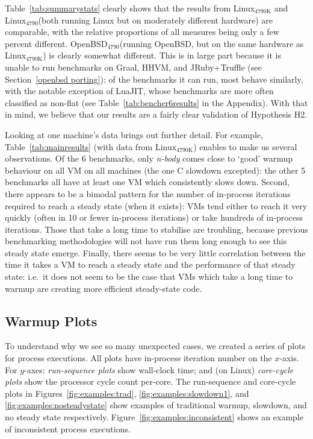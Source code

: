 \documentclass[preprint,numbers,10pt]{sigplanconf}
\newcommand{\nbody}{\emph{n-body}\xspace}
\newcommand{\bencherthree}{Linux$_\mathrm{4790K}$\xspace}
\newcommand{\bencherfive}{Linux$_\mathrm{4790}$\xspace}
\newcommand{\benchersix}{OpenBSD$_\mathrm{4790}$\xspace}
\begin{document}
Table~\ref{tab:summarystats} clearly shows that the results from \bencherthree
and \bencherfive (both running Linux but on moderately different hardware) are
comparable, with the relative proportions of all measures being only a few
percent different. \benchersix (running OpenBSD, but on the same hardware as
\bencherthree) is clearly somewhat different. This is in large part because it
is unable to run benchmarks on Graal, HHVM, and JRuby+Truffle (see
Section~\ref{openbsd porting}): of the benchmarks it can run, most behave
similarly, with the notable exception of LuaJIT, whose benchmarks are more often
classified as non-flat (see Table~\ref{tab:bencher6results} in the Appendix).
With that in mind, we believe that our results are a fairly clear validation of
Hypothesis H2.

Looking at one machine's data brings out further detail. For
example, Table~\ref{tab:mainresults} (with data from \bencherthree)
enables to make us several observations. Of the 6 benchmarks, only \nbody comes
close to `good' warmup behaviour on all
VM on all machines (the one C slowdown excepted): the other 5 benchmarks all have at least one VM which consistently
slows down. Second, there appears to be a bimodal pattern for the number
of in-process iterations required to reach a steady state (when it exists): VMs
tend either to reach it very quickly (often in 10 or fewer in-process iterations)
or take hundreds of in-process iterations. Those that take a long time
to stabilise are troubling, because previous benchmarking methodologies
will not have run them long enough to see this steady state emerge.
Finally, there seems to be very little
correlation between the time it takes a VM to reach a steady state and the
performance of that steady state: i.e.~it does not seem to be the case that VMs
which take a long time to warmup are creating more efficient
steady-state code.


\subsection{Warmup Plots}

To understand why we see so many unexpected cases, we created a series of plots
for process executions. All
plots have in-process iteration number on the $x$-axis. For $y$-axes:
\emph{run-sequence plots} show wall-clock time; and (on Linux) \emph{core-cycle plots} show
the processor cycle count per-core.
The run-sequence and core-cycle plots in Figures~\ref{fig:examples:trad}, \ref{fig:examples:slowdown1},
and \ref{fig:examples:nosteadystate} show examples of traditional warmup, slowdown,
and no steady state respectively. Figure~\ref{fig:examples:inconsistent} shows
an example of inconsistent process executions.
\end{document}
